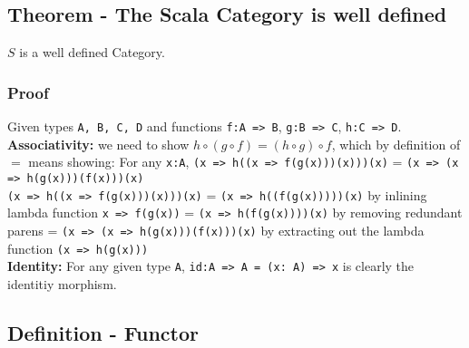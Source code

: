\documentclass[9pt]{article} %
\begin{document}
\subsection{Theorem - The Scala Category is well defined}

$S$ is a well defined Category.

\subsubsection{Proof}

Given types \texttt{A, B, C, D} and functions \texttt{f:A => B}, \texttt{g:B => C}, \texttt{h:C => D}.\newline
\\
\noindent \textbf{Associativity:} we need to show $h \circ (g \circ f) = (h \circ g) \circ f$, which by definition of $=$ means showing:\newline
\noindent For any \texttt{x:A}, \texttt{(x => h((x => f(g(x)))(x)))(x)} = \texttt{(x => (x => h(g(x)))(f(x)))(x)}\newline
\\
\noindent \texttt{(x => h((x => f(g(x)))(x)))(x)} = \texttt{(x => h((f(g(x)))))(x)} by inlining lambda function \texttt{x => f(g(x))}\newline
= \texttt{(x => h(f(g(x))))(x)}  by removing redundant parens \newline
= \texttt{(x => (x => h(g(x)))(f(x)))(x)} by extracting out the lambda function \texttt{(x => h(g(x)))}\newline
\\
\noindent \textbf{Identity:} For any given type \texttt{A}, \texttt{id:A => A = (x: A) => x} is clearly the identitiy morphism.


\subsection{Definition - Functor}
\end{document}

